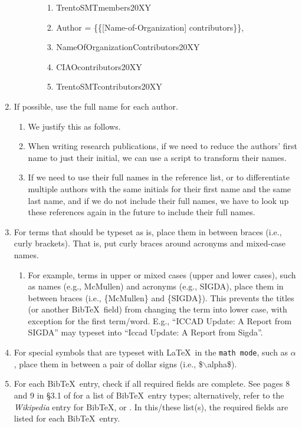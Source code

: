 \documentclass[letter,12pt]{article}
\begin{document}
\begin{enumerate}
\begin{enumerate}
\begin{enumerate}
\begin{enumerate}
			\item TrentoSMTmembers20XY
			\item Author = \{\{[Name-of-Organization] contributors\}\},
			\item NameOfOrganizationContributors20XY
			\item CIAOcontributors20XY
			\item TrentoSMTcontributors20XY
			\end{enumerate}
		\end{enumerate} 
	\end{enumerate}
\item If possible, use the full name for each author. \vspace{-0.3cm}
	\begin{enumerate} \itemsep -2pt
	\item We justify this as follows.
	\item When writing research publications, if we need to reduce the authors' first name to just their initial, we can use a script to transform their names.
	\item If we need to use their full names in the reference list, or to differentiate multiple authors with the same initials for their first name and the same last name, and if we do not include their full names, we have to look up these references again in the future to include their full names.
	\end{enumerate}
\item For terms that should be typeset as is, place them in between braces (i.e., curly brackets). That is, put curly braces around acronyms and mixed-case names. \vspace{-0.3cm}
	\begin{enumerate} \itemsep -2pt
	\item For example, terms in upper or mixed cases (upper and lower cases), such as names (e.g., McMullen) and acronyms (e.g., SIGDA), place them in between braces (i.e., \{McMullen\} and \{SIGDA\}). This prevents the titles (or another {\sc Bib}\TeX\ field) from changing the term into lower case, with exception for the first term/word. E.g., ``ICCAD Update: A Report from SIGDA'' may typeset into ``Iccad Update: A Report from Sigda''.
	\end{enumerate}
\item For special symbols that are typeset with \LaTeX\ in the {\tt math mode}, such as $\alpha$, place them in between a pair of dollar signs (i.e., \$$\backslash$alpha\$).
\item For each {\sc Bib}\TeX\ entry, check if all required fields are complete. See pages 8 and 9 in \S3.1 of \cite{Patashnik1988} for a list of {\sc Bib}\TeX\ entry types; alternatively, refer to the {\it Wikipedia} entry for {\sc Bib}\TeX, or \cite[\S12.2.1, pp. 230--231]{Kopka2004}. In this/these list(s), the required fields are listed for each {\sc Bib}\TeX\ entry.

\end{enumerate}
\end{document}
